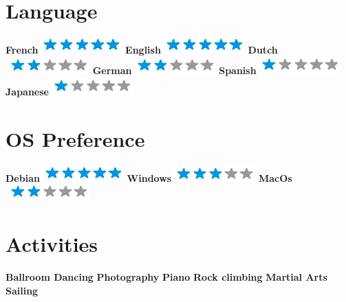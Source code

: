\begin{aside}
  ~
  \makecvsideheader%
  \section{Language}
    \textbf{French}\includegraphics[scale=0.40]{img/5stars.png}
    \textbf{English}\includegraphics[scale=0.40]{img/5stars.png}
    \textbf{Dutch}\includegraphics[scale=0.40]{img/2stars.png}
    \textbf{German}\includegraphics[scale=0.40]{img/2stars.png}
    \textbf{Spanish}\includegraphics[scale=0.40]{img/1stars.png}
    \textbf{Japanese}\includegraphics[scale=0.40]{img/1stars.png}
  ~
  \section{OS Preference}
    \textbf{Debian}\includegraphics[scale=0.40]{img/5stars.png}
    \textbf{Windows}\includegraphics[scale=0.40]{img/3stars.png}
    \textbf{MacOs}\includegraphics[scale=0.40]{img/2stars.png}
  ~
  \section{Activities}
    \textbf{Ballroom Dancing}
    \textbf{Photography}
    \textbf{Piano}
    \textbf{Rock climbing}
    \textbf{Martial Arts}
    \textbf{Sailing}
\end{aside}
